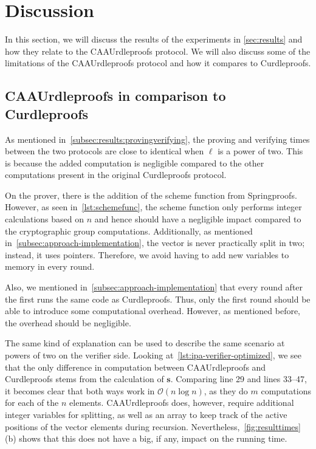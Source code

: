 

\section{Discussion}\label{sec:discussion}
In this section, we will discuss the results of the experiments in \autoref{sec:results} and how they relate to the CAAUrdleproofs protocol.
We will also discuss some of the limitations of the CAAUrdleproofs protocol and how it compares to Curdleproofs.


\subsection{CAAUrdleproofs in comparison to Curdleproofs}\label{subsec:CAAUrdleproofs-vs-Curdleproofs}
As mentioned in~\autoref{subsec:results:provingverifying}, the proving and verifying times between the two protocols are close to identical when $\ell$ is a power of two.
This is because the added computation is negligible compared to the other computations present in the original Curdleproofs protocol.

On the prover, there is the addition of the scheme function from Springproofs.
However, as seen in~\autoref{lst:schemefunc}, the scheme function only performs integer calculations based on $n$ and hence should have a negligible impact compared to the cryptographic group computations.
Additionally, as mentioned in~\autoref{subsec:approach-implementation}, the vector is never practically split in two; instead, it uses pointers.
Therefore, we avoid having to add new variables to memory in every round.

Also, we mentioned in~\autoref{subsec:approach-implementation} that every round after the first runs the same code as Curdleproofs.
Thus, only the first round should be able to introduce some computational overhead.
However, as mentioned before, the overhead should be negligible.

The same kind of explanation can be used to describe the same scenario at powers of two on the verifier side.
Looking at~\autoref{lst:ipa-verifier-optimized}, we see that the only difference in computation between CAAUrdleproofs and Curdleproofs stems from the calculation of $\mathbf{s}$.
Comparing line 29 and lines 33--47, it becomes clear that both ways work in $\mathcal{O}(n\log n)$, as they do $m$ computations for each of the $n$ elements.
CAAUrdleproofs does, however, require additional integer variables for splitting, as well as an array to keep track of the active positions of the vector elements during recursion.
Nevertheless,~\autoref{fig:resulttimes}(b) shows that this does not have a big, if any, impact on the running time.

